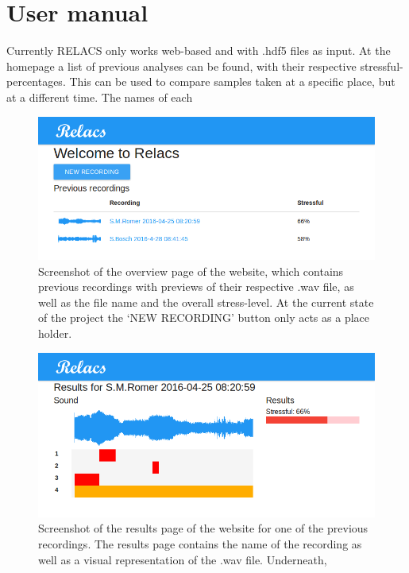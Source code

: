 \documentclass[a4paper]{article}
\begin{document}
\section{User manual}
Currently RELACS only works web-based and with .hdf5 files as input. At the homepage a list of previous analyses can be found, with their respective stressful-percentages. This can be used to compare samples taken at a specific place, but at a different time. The names of each 

\begin{figure}[h]
\centering
\includegraphics[width=0.9\linewidth]{./Website}
\caption{Screenshot of the overview page of the website, which contains previous recordings with previews of their respective .wav file, as well as the file name and the overall stress-level. At the current state of the project the `NEW RECORDING' button only acts as a place holder.}
\label{fig:Website}
\end{figure}

\begin{figure}[h]
\centering
\includegraphics[width=0.9\linewidth]{./Audio1Results}
\caption{Screenshot of the results page of the website for one of the previous recordings. The results page contains the name of the recording as well as a visual representation of the .wav file. Underneath,  }
\label{fig:Audio1}
\end{figure}
\end{document}
